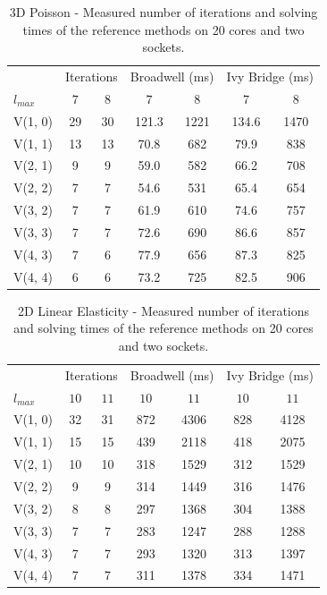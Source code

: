 \begin{table}
	\caption{3D Poisson - Measured number of iterations and solving times of the reference methods on 20 cores and two sockets.}
	\label{table:poisson-3D-reference-methods}
	\centering
	\begin{tabular}{l c c c c c c}
		\toprule
		& \multicolumn{2}{c}{Iterations} & \multicolumn{2}{c}{Broadwell (ms)} & \multicolumn{2}{c}{Ivy Bridge (ms)} \\
		\cmidrule(r){2-3} \cmidrule(r){4-5} \cmidrule(r){6-7}
		$l_{max}$ & $7$& $8$ & $7$ & $8$ & $7$ & $8$\\
		\midrule
		V(1, 0) & 29 & 30 & 121.3 &1221 & 134.6 & 1470 \\
		\midrule
		V(1, 1) & 13 & 13 & 70.8 & 682 & 79.9 & 838 \\
		\midrule
		V(2, 1) & 9 & 9 & 59.0 & 582 & 66.2 & 708 \\
		\midrule
		V(2, 2) & 7 & 7 & 54.6 & 531 & 65.4 & 654 \\
		\midrule
		V(3, 2) & 7 & 7 & 61.9 & 610 & 74.6 & 757 \\
		\midrule
		V(3, 3) & 7 & 7 & 72.6 & 690 & 86.6 & 857 \\
		\midrule
		V(4, 3) & 7 & 6 & 77.9 & 656 & 87.3 & 825 \\
		\midrule
		V(4, 4) & 6 & 6 & 73.2 & 725 & 82.5 & 906 \\
		\bottomrule
	\end{tabular}
\end{table}
\begin{table}
	\caption{2D Linear Elasticity - Measured number of iterations and solving times of the reference methods on 20 cores and two sockets.}
	\label{table:linear-elasticity-2D-reference-methods}
	\centering
	\begin{tabular}{l c c c c c c}
		\toprule
		& \multicolumn{2}{c}{Iterations} & \multicolumn{2}{c}{Broadwell (ms)} & \multicolumn{2}{c}{Ivy Bridge (ms)} \\
		\cmidrule(r){2-3} \cmidrule(r){4-5} \cmidrule(r){6-7}
		$l_{max}$ & $10$& $11$ & $10$ & $11$ & $10$ & $11$\\
		\midrule
		V(1, 0) & 32 & 31 & 872 & 4306 & 828 & 4128 \\
		\midrule
		V(1, 1) & 15 & 15 & 439 & 2118 & 418 & 2075\\
		\midrule
		V(2, 1) & 10 & 10 & 318 & 1529 & 312 & 1529 \\
		\midrule
		V(2, 2) & 9 & 9 & 314 & 1449 & 316 & 1476 \\
		\midrule
		V(3, 2) & 8 & 8 & 297 & 1368 & 304 & 1388 \\
		\midrule
		V(3, 3) & 7 & 7 & 283 & 1247 & 288 & 1288 \\
		\midrule
		V(4, 3) & 7 & 7 & 293 & 1320 & 313 & 1397 \\
		\midrule
		V(4, 4) & 7 & 7 & 311 & 1378 & 334 & 1471 \\
		\bottomrule
	\end{tabular}
\end{table}


